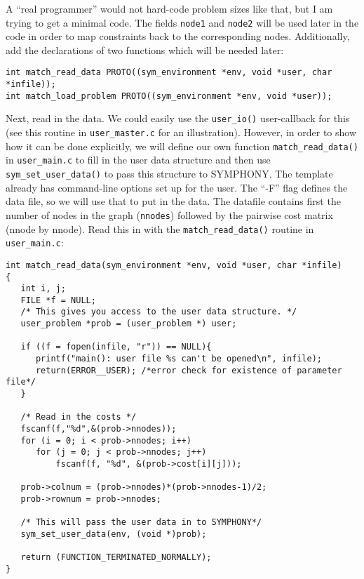 \documentclass[11pt]{article}
\begin{document}
{A ``real programmer'' would not hard-code problem sizes like that, but I am
trying to get a minimal code. The fields \texttt{node1} and \texttt{node2} will
be used later in the code in order to map constraints back to the
corresponding nodes. Additionally, add the declarations of two functions which 
will be needed later: 

\begin{verbatim}
int match_read_data PROTO((sym_environment *env, void *user, char *infile));
int match_load_problem PROTO((sym_environment *env, void *user));
\end{verbatim}

Next, read in the data. We could easily use the \texttt{user\_io()}
user-callback for this (see this routine in \texttt{user\_master.c} for an
illustration). However, in order to show how it can be done explicitly, we
will define our own function \texttt{match\_read\_data()} in
\texttt{user\_main.c} to fill in the user data structure and then use
\texttt{sym\_set\_user\_data()} to pass this structure to SYMPHONY. The
template already has command-line options set up for the user. The ``-F'' flag
defines the data file, so we will use that to put in the data. The datafile
contains first the number of nodes in the graph (\texttt{nnodes}) followed by
the pairwise cost matrix (nnode by nnode).  Read this in with the
\texttt{match\_read\_data()} routine in \texttt{user\_main.c}:

\begin{verbatim}
int match_read_data(sym_environment *env, void *user, char *infile)
{
   int i, j;
   FILE *f = NULL;
   /* This gives you access to the user data structure. */
   user_problem *prob = (user_problem *) user;

   if ((f = fopen(infile, "r")) == NULL){
      printf("main(): user file %s can't be opened\n", infile);
      return(ERROR__USER); /*error check for existence of parameter file*/
   }

   /* Read in the costs */
   fscanf(f,"%d",&(prob->nnodes));
   for (i = 0; i < prob->nnodes; i++)
      for (j = 0; j < prob->nnodes; j++)
          fscanf(f, "%d", &(prob->cost[i][j]));
   
   prob->colnum = (prob->nnodes)*(prob->nnodes-1)/2;
   prob->rownum = prob->nnodes;

   /* This will pass the user data in to SYMPHONY*/
   sym_set_user_data(env, (void *)prob);

   return (FUNCTION_TERMINATED_NORMALLY);
}
\end{verbatim}   

}
\end{document}
